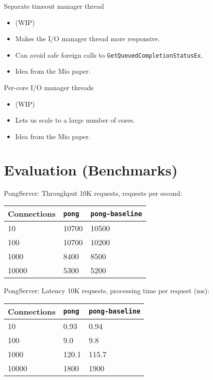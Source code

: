 \documentclass{beamer}
\begin{document}
\begin{frame}{Separate timeout manager thread}
  \begin{itemize}
    \item (WIP)
    \item Makes the I/O manager thread more responsive.
    \item Can avoid safe foreign calls to \texttt{GetQueuedCompletionStatusEx}.
    \item Idea from the Mio paper.
\end{itemize}
\end{frame}

\begin{frame}{Per-core I/O manager threads}
  \begin{itemize}
    \item (WIP)
    \item Lets us scale to a large number of cores.
    \item Idea from the Mio paper.
\end{itemize}
\end{frame}

\section {Evaluation (Benchmarks)}

\begin{frame}{PongServer: Throughput}
  10K requests, requests per second:
\begin{tabular}{ | l | l | l | }
  \hline
  Connections & \texttt{pong} & \texttt{pong-baseline} \\
  \hline
  10 & 10700 & 10500 \\
  \hline
  100 & 10700 & 10200 \\
  \hline
  1000 & 8400 & 8500 \\
  \hline
  10000 & 5300 & 5200 \\
  \hline
\end{tabular}
\end{frame}

\begin{frame}{PongServer: Latency}
  10K requests, processing time per request (ms):
\begin{tabular}{ | l | l | l | }
  \hline
  Connections & \texttt{pong} & \texttt{pong-baseline} \\
  \hline
  10 &  0.93 &  0.94 \\
  \hline
  100 &  9.0 &  9.8 \\
  \hline
  1000 & 120.1 & 115.7 \\
  \hline
  10000 & 1800 & 1900 \\
  \hline
\end{tabular}
\end{frame}
\end{document}
